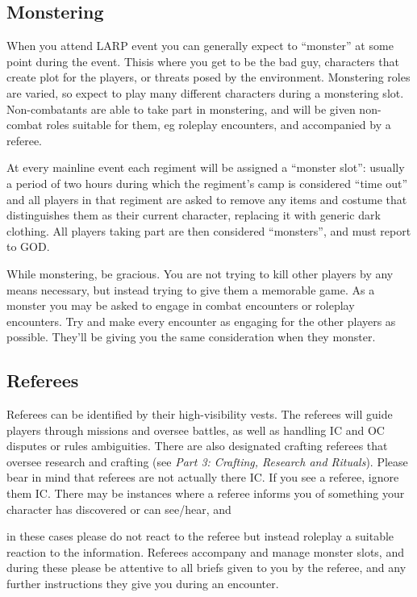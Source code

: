 \documentclass{scrbook}
\begin{document}
\subsection{Monstering}

When you attend LARP event you can generally expect to ``monster'' at some point during the event. Thisis where you get to be the bad guy, characters that create plot for the players, or threats posed by the environment. Monstering roles are varied, so expect to play many different characters during a monstering slot. Non-combatants are able to take part in monstering, and will be given non-combat roles suitable for them, eg roleplay encounters, and accompanied by a referee.

At every mainline event each regiment will be assigned a ``monster slot'': usually a period of two hours during which the regiment's camp is considered ``time out'' and all players in that regiment are asked to remove any items and costume that distinguishes them as their current character, replacing it with generic dark clothing. All players taking part are then considered ``monsters'', and must report to GOD.

While monstering, be gracious. You are not trying to kill other players by any means necessary, but instead trying to give them a memorable game. As a monster you may be asked to engage in combat encounters or roleplay encounters. Try and make every encounter as engaging for the other players as possible. They'll be giving you the same consideration when they monster.

\subsection{Referees}

Referees can be identified by their high-visibility vests. The referees will guide players through missions and oversee battles, as well as handling IC and OC disputes or rules ambiguities. There are also designated crafting referees that oversee research and crafting (see \textit{Part 3: Crafting, Research and Rituals}). Please bear in mind that referees are not actually there IC. If you see a referee, ignore them IC. There may be instances where a referee informs you of something your character has discovered or can see/hear, and

in these cases please do not react to the referee but instead roleplay a suitable reaction to the information. Referees accompany and manage monster slots, and during these please be attentive to all briefs given to you by the referee, and any further instructions they give you during an encounter.
\end{document}
